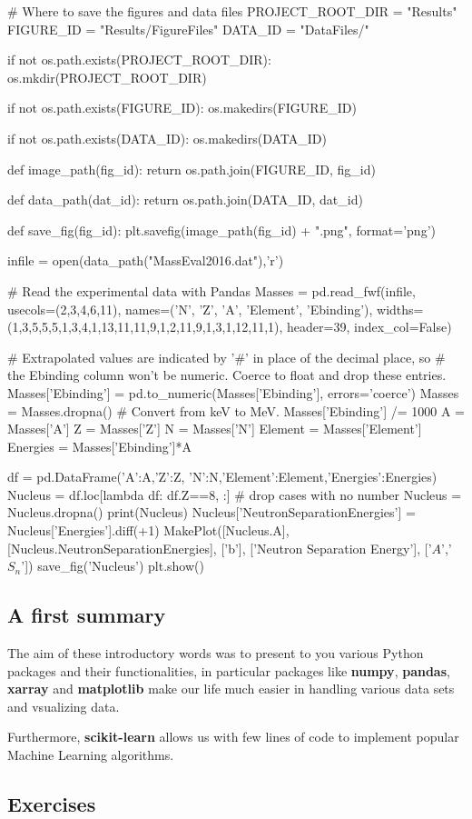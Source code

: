 \documentclass[%
oneside,                 %
final,                   %
10pt]{article}
\begin{document}
# Where to save the figures and data files
PROJECT_ROOT_DIR = "Results"
FIGURE_ID = "Results/FigureFiles"
DATA_ID = "DataFiles/"

if not os.path.exists(PROJECT_ROOT_DIR):
    os.mkdir(PROJECT_ROOT_DIR)

if not os.path.exists(FIGURE_ID):
    os.makedirs(FIGURE_ID)

if not os.path.exists(DATA_ID):
    os.makedirs(DATA_ID)

def image_path(fig_id):
    return os.path.join(FIGURE_ID, fig_id)

def data_path(dat_id):
    return os.path.join(DATA_ID, dat_id)

def save_fig(fig_id):
    plt.savefig(image_path(fig_id) + ".png", format='png')

infile = open(data_path("MassEval2016.dat"),'r')


# Read the experimental data with Pandas
Masses = pd.read_fwf(infile, usecols=(2,3,4,6,11),
              names=('N', 'Z', 'A', 'Element', 'Ebinding'),
              widths=(1,3,5,5,5,1,3,4,1,13,11,11,9,1,2,11,9,1,3,1,12,11,1),
              header=39,
              index_col=False)

# Extrapolated values are indicated by '#' in place of the decimal place, so
# the Ebinding column won't be numeric. Coerce to float and drop these entries.
Masses['Ebinding'] = pd.to_numeric(Masses['Ebinding'], errors='coerce')
Masses = Masses.dropna()
# Convert from keV to MeV.
Masses['Ebinding'] /= 1000
A = Masses['A']
Z = Masses['Z']
N = Masses['N']
Element = Masses['Element']
Energies = Masses['Ebinding']*A

df = pd.DataFrame({'A':A,'Z':Z, 'N':N,'Element':Element,'Energies':Energies})
Nucleus = df.loc[lambda df: df.Z==8, :]
# drop cases with no number
Nucleus = Nucleus.dropna()
print(Nucleus)
Nucleus['NeutronSeparationEnergies'] = Nucleus['Energies'].diff(+1)
MakePlot([Nucleus.A], [Nucleus.NeutronSeparationEnergies], ['b'], ['Neutron Separation Energy'], ['$A$','$S_n$'])
save_fig('Nucleus')
plt.show()

\epycod






\subsection{A first summary}

The aim of these introductory words was to present to you various
Python packages and their functionalities, in particular packages like
\textbf{numpy}, \textbf{pandas}, \textbf{xarray} and \textbf{matplotlib} make our life much easier
in handling various data sets and vsualizing data. 

Furthermore,
\textbf{scikit-learn} allows us with few lines of code to implement popular
Machine Learning algorithms.


\subsection{Exercises}


\end{document}
